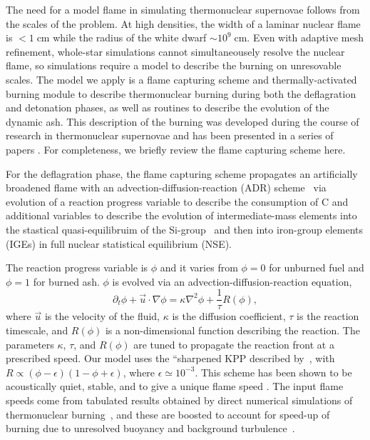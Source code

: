 \documentclass[iop,apj]{emulateapj}
\newcommand{\pv}{\ensuremath{\phi}}
\begin{document}
The need for a model flame in simulating thermonuclear supernovae follows 
from the scales of the problem. At high densities, the width of a laminar 
nuclear flame is $< 1\ensuremath{\;}{\ensuremath{\mathrm{cm}}}$ while the 
radius of the white dwarf $\sim 10^9\ensuremath{\;}{\ensuremath{\mathrm{cm}}}$.
Even with adaptive mesh refinement, whole-star simulations cannot 
simultaneousely resolve the nuclear flame, so simulations require a model to 
describe the burning on unresovable scales.  The model we apply is a flame 
capturing scheme and thermally-activated burning module to describe
thermonuclear burning during both the deflagration and detonation phases, 
as well as routines to describe the evolution of the dynamic ash. 
This description of the burning was developed during the course of research in 
thermonuclear supernovae and has been presented in a series of 
papers \citep[See][and references therein]{chandlery}. For completeness, 
we briefly review the flame capturing scheme here.

For the deflagration phase, the flame capturing scheme propagates an 
artificially broadened flame with an advection-diffusion-reaction (ADR)
scheme~\cite{Khok95,VladWeirRyzh06} via evolution of
a reaction progress variable to describe the consumption of C
and additional variables to describe the evolution of intermediate-mass
elements into the stastical quasi-equilibruim of the 
Si-group~\cite{ifk1981,khok1981,khok1983} and then into iron-group elements
(IGEs) in full nuclear statistical equilibrium (NSE).

The reaction progress variable is $\phi$ and it varies from $\phi=0$ for
unburned fuel and $\phi=1$ for burned ash. $\phi$ is evolved
via an advection-diffusion-reaction equation,
\begin{equation}
  \label{eq:ard}
  \partial_t \pv + \vec{u}\cdot\nabla \pv = \kappa \nabla^2 \pv +
\frac{1}{\tau} R\left(\phi\right) ,
\end{equation}
where $\vec{u}$ is the velocity of the fluid, $\kappa$ is the
diffusion coefficient, $\tau$ is the reaction timescale, and $R(\phi)$ is
a non-dimensional function describing the reaction. The parameters
$\kappa$, $\tau$, and $R(\phi)$ are tuned to propagate the reaction
front at a prescribed speed.  Our model uses the ``sharpened KPP
 described by~\cite{VladWeirRyzh06}, 
with $R\propto(\phi-\epsilon)(1-\phi+\epsilon)$, where
$\epsilon \simeq 10^{-3}$.  This scheme has been shown to be
acoustically quiet, stable, and to give a unique flame speed
\cite{townsley.calder.ea:flame}. The input flame speeds come from
tabulated results obtained by direct numerical simulations of
thermonuclear burning~\cite{timmes92,Chamulak2007The-Laminar-Fla},
and 
these are boosted to account for speed-up of burning due to unresolved 
buoyancy and background turbulence~\cite{Khok95,
gamezo.khokhlov.ea:thermonuclear,townsley.calder.ea:flame,jacketal2014}.
\end{document}
